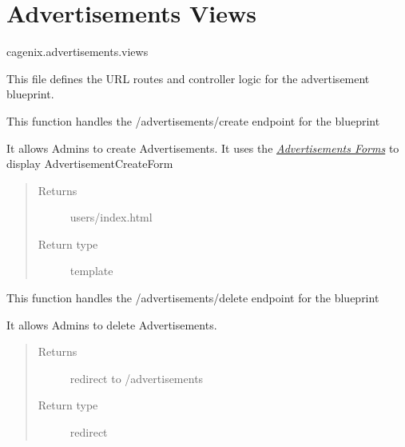 \documentclass[letterpaper,10pt,english]{sphinxmanual}
\begin{document}
\section{Advertisements Views}
\label{dev-advertisements:advertisements-views-label}\label{dev-advertisements:advertisements-views}\label{dev-advertisements:module-cagenix.advertisements.views}
cagenix.advertisements.views

This file defines the URL routes and controller logic for the advertisement blueprint.

\begin{fulllineitems}
\label{dev-advertisements:cagenix.advertisements.views.advertisements_create}
This function handles the /advertisements/create endpoint for the blueprint

It allows Admins to create Advertisements.  It uses the {\hyperref[dev-advertisements:advertisements-forms-label]{\emph{Advertisements Forms}}}
to display AdvertisementCreateForm
\begin{quote}\begin{description}
\item[{Returns}] \leavevmode
users/index.html

\item[{Return type}] \leavevmode
template

\end{description}\end{quote}

\end{fulllineitems}


\begin{fulllineitems}
\label{dev-advertisements:cagenix.advertisements.views.advertisements_delete}
This function handles the /advertisements/delete endpoint for the blueprint

It allows Admins to delete Advertisements.
\begin{quote}\begin{description}
\item[{Returns}] \leavevmode
redirect to /advertisements

\item[{Return type}] \leavevmode
redirect

\end{description}\end{quote}

\end{fulllineitems}
\end{document}
